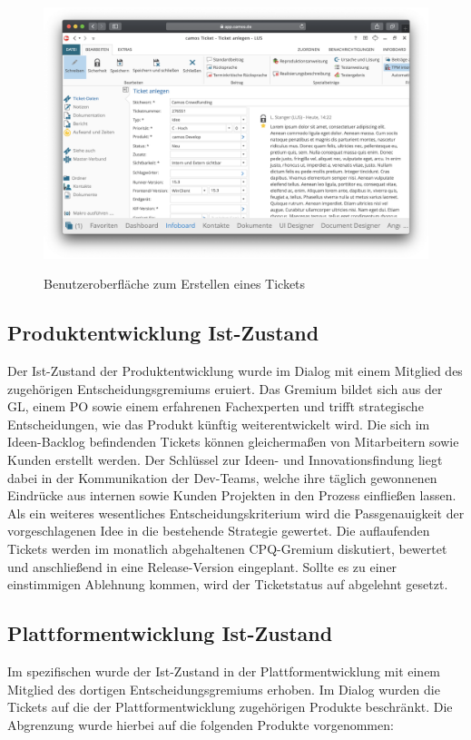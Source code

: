 \begin{figure}
	\centering
	\includegraphics[width=\textwidth]{images/Ticket_erstellen}
	\label{fig:ticket}
	\caption{Benutzeroberfläche zum Erstellen eines Tickets}
\end{figure}

\subsection*{Produktentwicklung Ist-Zustand}
Der Ist-Zustand der Produktentwicklung wurde im Dialog mit einem Mitglied des zugehörigen Entscheidungsgremiums eruiert. Das Gremium bildet sich aus der \ac{GL}, einem \ac{PO} sowie einem erfahrenen Fachexperten und trifft strategische Entscheidungen, wie das Produkt künftig weiterentwickelt wird. Die sich im Ideen-Backlog befindenden Tickets können gleichermaßen von Mitarbeitern sowie Kunden erstellt werden. Der Schlüssel zur Ideen- und Innovationsfindung liegt dabei in der Kommunikation der Dev-Teams, welche ihre täglich gewonnenen Eindrücke aus internen sowie Kunden Projekten in den Prozess einfließen lassen. Als ein weiteres wesentliches Entscheidungskriterium wird die Passgenauigkeit der vorgeschlagenen Idee in die bestehende Strategie gewertet. Die auflaufenden Tickets werden im monatlich abgehaltenen \ac{CPQ}-Gremium diskutiert, bewertet und anschließend in eine Release-Version eingeplant. Sollte es zu einer einstimmigen Ablehnung kommen, wird der Ticketstatus auf abgelehnt gesetzt.

\subsection*{Plattformentwicklung Ist-Zustand}
Im spezifischen wurde der Ist-Zustand in der Plattformentwicklung mit einem Mitglied des dortigen Entscheidungsgremiums erhoben. Im Dialog wurden die Tickets auf die der Plattformentwicklung zugehörigen Produkte beschränkt. Die Abgrenzung wurde hierbei auf die folgenden Produkte vorgenommen:

